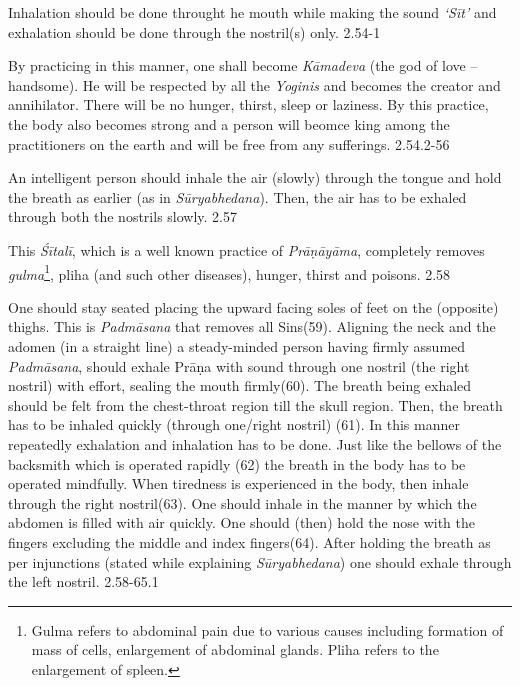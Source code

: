 
Inhalation should be done throught he mouth while making the sound \textit{‘Sīt’} and exhalation should be done through the nostril(s) only. 2.54-1


By practicing in this manner, one shall become \textit{Kāmadeva} (the god of love – handsome). He will be respected by all the \textit{Yoginis} and becomes the creator and annihilator. There will be no hunger, thirst, sleep or laziness. By this practice, the body also becomes strong and a person will beomce king among the practitioners on the earth and will be free from any sufferings.   2.54.2-56


An intelligent person should inhale the air (slowly) through the tongue and hold the breath as earlier (as in \textit{Sūryabhedana}). Then, the air has to be exhaled through both the nostrils slowly.  2.57


This \textit{Śītalī}, which is a well known practice of \textit{Prāṇāyāma}, completely removes \textit{gulma}\footnote{Gulma refers to abdominal pain due to various causes including formation of mass of cells, enlargement of abdominal glands. Pliha refers to the enlargement of spleen.}, pliha (and such other diseases), hunger, thirst and poisons.  2.58


One should stay seated placing the upward facing soles of feet on the (opposite) thighs. This is \textit{Padmāsana} that removes all Sins(59). Aligning the neck and the adomen (in a straight line) a steady-minded person having firmly assumed \textit{Padmāsana}, should exhale Prāṇa with sound through one nostril (the right nostril) with effort, sealing the mouth firmly(60). The breath being exhaled should be felt from the chest-throat region till the skull region. Then, the breath has to be inhaled quickly (through one/right nostril) (61). In this manner repeatedly exhalation and inhalation has to be done. Just like the bellows of the backsmith which is operated rapidly (62) the breath in the body has to be operated mindfully. When tiredness is experienced in the body, then inhale through the right nostril(63). One should inhale in the manner by which the abdomen is filled with air quickly. One should (then) hold the nose with the fingers excluding the middle and index fingers(64). After holding the breath as per injunctions (stated while explaining \textit{Sūryabhedana}) one should exhale through the left nostril. 2.58-65.1

